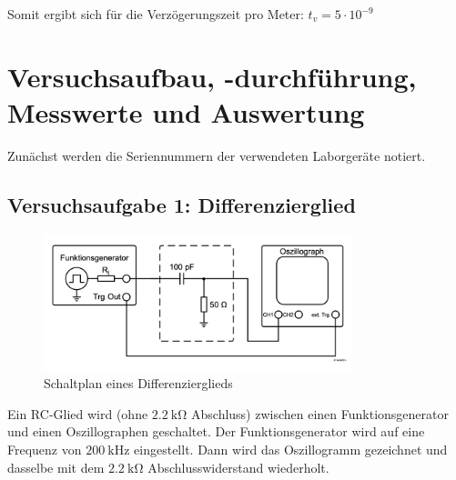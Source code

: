 \documentclass{article}
\begin{document}
Somit ergibt sich für die Verzögerungszeit pro Meter: $t_v = 5 \cdot 10^{-9}$

\section{Versuchsaufbau, -durchführung, Messwerte und Auswertung}
		Zunächst werden die Seriennummern der verwendeten Laborgeräte notiert.
		
		
		\subsection{Versuchsaufgabe 1: Differenzierglied}


			\begin{figure}[H]
				\centering
				\includegraphics[width=0.8\textwidth]{figs/Aufbau_1_1_Differenzierglied.png}
				\caption{Schaltplan eines Differenzierglieds~\cite{anleitung}}
				\label{fig:aufbau_1_1_differenzierglied}
			\end{figure}
			Ein RC-Glied wird (ohne $\SI{2.2}{\kilo\ohm}$ Abschluss) zwischen einen Funktionsgenerator und einen Oszillographen geschaltet. Der Funktionsgenerator wird auf eine Frequenz von $\SI{200}{\kilo\hertz}$ eingestellt. Dann wird das Oszillogramm gezeichnet und dasselbe mit dem $\SI{2.2}{\kilo\ohm}$ Abschlusswiderstand wiederholt.
			
\end{document}
